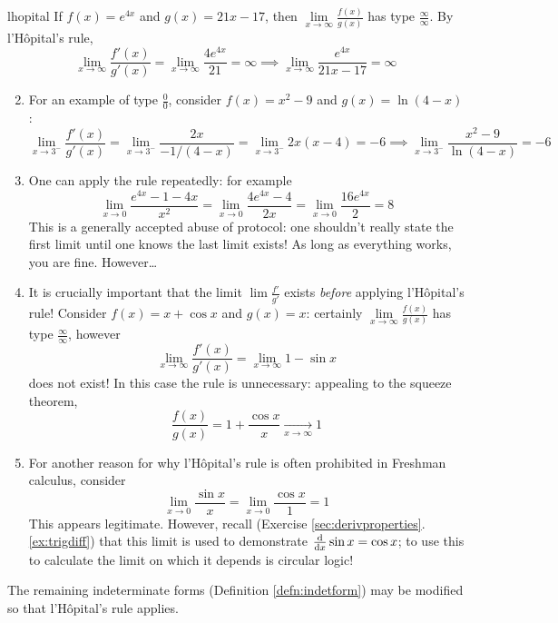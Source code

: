 \begin{examples}{}{lhopital}
	\exstart If $f(x)=e^{4x}$ and $g(x)=21x-17$, then $\lim\limits_{x\to\infty}\frac{f(x)}{g(x)}$ has type $\frac\infty\infty$. By l'Hôpital's rule,
	\[
	 	\lim_{x\to\infty}\frac{f'(x)}{g'(x)}
	 	=\lim_{x\to\infty}\frac{4e^{4x}}{21}=\infty
	 	\implies \lim_{x\to\infty}\frac{e^{4x}}{21x-17}=\infty
	\]
	
	\begin{enumerate}\setcounter{enumi}{1}\itemsep0pt
	  \item For an example of type $\frac 00$, consider $f(x)=x^2-9$ and $g(x)=\ln(4-x)$:
	  \[
		  \lim_{x\to 3^-}\frac{f'(x)}{g'(x)} 
		  =\lim_{x\to 3^-}\frac{2x}{-1/(4-x)} 
		  =\lim_{x\to 3^-}2x(x-4)=-6
		  \implies \lim_{x\to 3^-}\frac{x^2-9}{\ln(4-x)}=-6
	  \]
	  
	  \item One can apply the rule repeatedly: for example
	  \[
	  	\lim_{x\to 0}\frac{e^{4x}-1-4x}{x^2}
	  	=\lim_{x\to 0}\frac{4e^{4x}-4}{2x} 
	  	=\lim_{x\to 0}\frac{16e^{4x}}{2}=8
	  \]
	  This is a generally accepted abuse of protocol: one shouldn't really state the first limit until one knows the last limit exists! As long as everything works, you are fine. However\ldots
	  
	  \item\label{ex:lhopitalproblem1} It is crucially important that the limit $\lim\frac{f'}{g'}$ exists \emph{before} applying l'Hôpital's rule! Consider $f(x)=x+\cos x$ and $g(x)=x$: certainly $\lim\limits_{x\to\infty}\frac{f(x)}{g(x)}$ has type $\frac\infty\infty$, however
	  \[
	  	\lim\limits_{x\to\infty}\frac{f'(x)}{g'(x)}
	  	=\lim\limits_{x\to\infty}1-\sin x
	  \]
	  does not exist! In this case the rule is unnecessary: appealing to the squeeze theorem,
	  \[
	  	\frac{f(x)}{g(x)}
	  	=1+\frac{\cos x}x\xrightarrow[x\to\infty]{} 1
	  \]
	  
	 	\item For another reason for why l'Hôpital's rule is often prohibited in Freshman calculus, consider
	 	\[
	 		\lim_{x\to 0}\frac{\sin x}x
	 		=\lim_{x\to 0}\frac{\cos x}{1}=1
	 	\]
	 	This appears legitimate. However, recall (Exercise \ref*{sec:derivproperties}.\ref{ex:trigdiff}) that this limit is used to demonstrate $\frac{\mathrm{d} }{\mathrm{d} x}\sin x=\cos x$; to use this to calculate the limit on which it depends is circular logic!
	\end{enumerate}
\end{examples}

The remaining indeterminate forms (Definition \ref{defn:indetform}) may be modified so that l'Hôpital's rule applies.

